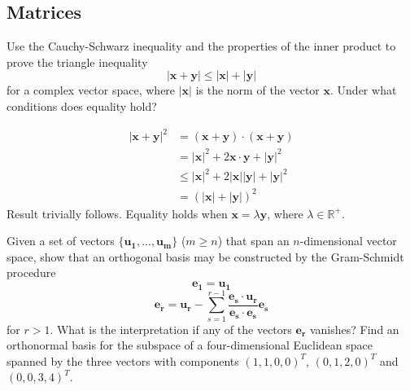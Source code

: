 \documentclass[a4paper]{article}
\begin{document}
\subsection*{Matrices}
\begin{qns}
Use the Cauchy-Schwarz inequality and the properties of the inner product to prove the triangle inequality
$$|\mathbf{x}+\mathbf{y}|\leq|\mathbf{x}|+|\mathbf{y}|$$
for a complex vector space, where $|\mathbf{x}|$ is the norm of the vector $\mathbf{x}$. Under what
conditions does equality hold?
\end{qns}
\begin{ans}
  \begin{align*}
    |\mathbf{x + y}|^2 &= \mathbf{(x + y)\cdot (x + y)}\\
    &= |\mathbf{x}|^2 + 2\mathbf{x\cdot y} + |\mathbf{y}|^2\\
    &\leq |\mathbf{x}|^2 + 2\mathbf{|x||y|} + |\mathbf{y}|^2\\
    &= (\mathbf{|x| + |y|})^2
  \end{align*}
Result trivially follows. Equality holds when $\mathbf{x}=\lambda\mathbf{y}$, where $\lambda\in\mathbb{R}^+$.
\end{ans}
\begin{qns}
Given a set of vectors $\{\mathbf{u_1},...,\mathbf{u_m}\}$ ($m\geq n$) that span an $n$-dimensional vector space, show that an orthogonal basis may be constructed by the Gram-Schmidt procedure 
$$\mathbf{e_1}=\mathbf{u_1}$$
$$\mathbf{e_r}=\mathbf{u_r}-\sum_{s=1}^{r-1}\frac{\mathbf{e_s}\cdot\mathbf{u_r}}{\mathbf{e_s}\cdot\mathbf{e_s}}\mathbf{e_s}$$
for $r>1$. What is the interpretation if any of the vectors $\mathbf{e_r}$ vanishes? Find an orthonormal basis for the subspace of a four-dimensional Euclidean space spanned by the three vectors with components $(1, 1, 0, 0)^T$, $(0, 1, 2, 0)^T$ and $(0, 0, 3, 4)^T$.
\end{qns}
\end{document}
